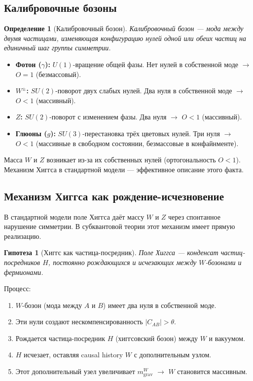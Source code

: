 \documentclass[12pt,a4paper]{article}
\newtheorem{definition}{Определение}[section]
\newtheorem{hypothesis}{Гипотеза}[section]
\begin{document}
\subsection{Калибровочные бозоны}

\begin{definition}[Калибровочный бозон]
Калибровочный бозон — мода между двумя частицами, изменяющая конфигурацию нулей одной или обеих частиц на единичный шаг группы симметрии.
\end{definition}

\begin{itemize}
    \item \textbf{Фотон ($\gamma$):} $U(1)$-вращение общей фазы. Нет нулей в собственной моде $\to$ $O = 1$ (безмассовый).
    \item \textbf{$W^\pm$:} $SU(2)$-поворот двух слабых нулей. Два нуля в собственной моде $\to$ $O < 1$ (массивный).
    \item \textbf{$Z$:} $SU(2)$-поворот с изменением фазы. Два нуля $\to$ $O < 1$ (массивный).
    \item \textbf{Глюоны ($g$):} $SU(3)$-перестановка трёх цветовых нулей. Три нуля $\to$ $O < 1$ (массивные в свободном состоянии, безмассовые в конфайнменте).
\end{itemize}

Масса $W$ и $Z$ возникает из-за их собственных нулей (ортогональность $O < 1$). Механизм Хиггса в стандартной модели — эффективное описание этого факта.

\subsection{Механизм Хиггса как рождение-исчезновение}

В стандартной модели поле Хиггса даёт массу $W$ и $Z$ через спонтанное нарушение симметрии. В субквантовой теории этот механизм имеет прямую реализацию.

\begin{hypothesis}[Хиггс как частица-посредник]
Поле Хиггса — конденсат частиц-посредников $H$, постоянно рождающихся и исчезающих между $W$-бозонами и фермионами.
\end{hypothesis}

Процесс:
\begin{enumerate}
    \item $W$-бозон (мода между $A$ и $B$) имеет два нуля в собственной моде.
    \item Эти нули создают нескомпенсированность $|C_{AB}| > \theta$.
    \item Рождается частица-посредник $H$ (хиггсовский бозон) между $W$ и вакуумом.
    \item $H$ исчезает, оставляя causal history $W$ с дополнительным узлом.
    \item Этот дополнительный узел увеличивает $m_{\text{grav}}^W$ $\to$ $W$ становится массивным.
\end{enumerate}
\end{document}

